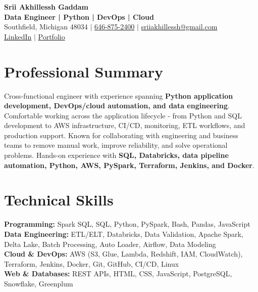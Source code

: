\documentclass[letterpaper,10pt]{article}
\begin{document}
\fontsize{9.35pt}{10.45pt}\selectfont

\begin{center}
    {\LARGE \textbf{Srii Akhillessh Gaddam}} \\[-1pt]
    \textbf{Data Engineer | Python | DevOps | Cloud} \\[2pt]
    Southfield, Michigan 48034 $|$
    \href{tel:6468752400}{646-875-2400} $|$
    \href{mailto:sriiakhillessh@gmail.com}{sriiakhillessh@gmail.com} \\[1pt]
    \href{https://www.linkedin.com/in/srii-akhiilessh-gaddam-b48668191/}{LinkedIn} $|$
    \href{https://sriiakhillesshg.github.io/portfolio/}{Portfolio}
\end{center}
\vspace{-8pt}

\section{Professional Summary}
\small{Cross-functional engineer with experience spanning \textbf{Python application development, DevOps/cloud automation, and data engineering}. Comfortable working across the application lifecycle - from Python and SQL development to AWS infrastructure, CI/CD, monitoring, ETL workflows, and production support. Known for collaborating with engineering and business teams to remove manual work, improve reliability, and solve operational problems. Hands-on experience with \textbf{SQL, Databricks, data pipeline automation, Python, AWS, PySpark, Terraform, Jenkins, and Docker}.}

\section{Technical Skills}
\small{
\textbf{Programming:} Spark SQL, SQL, Python, PySpark, Bash, Pandas, JavaScript \\
\textbf{Data Engineering:} ETL/ELT, Databricks, Data Validation, Apache Spark, Delta Lake, Batch Processing, Auto Loader, Airflow, Data Modeling \\
\textbf{Cloud \& DevOps:} AWS (S3, Glue, Lambda, Redshift, IAM, CloudWatch), Terraform, Jenkins, Docker, Git, GitHub, CI/CD, Linux \\
\textbf{Web \& Databases:} REST APIs, HTML, CSS, JavaScript, PostgreSQL, Snowflake, Greenplum
}
\end{document}
